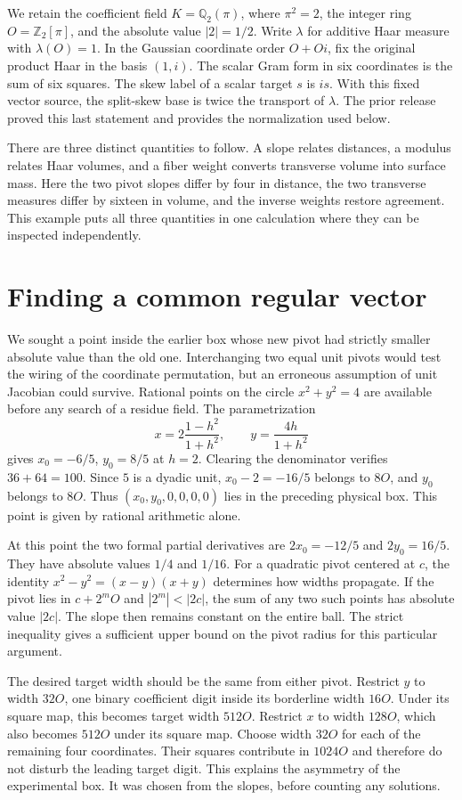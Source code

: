 \documentclass[12pt,letterpaper]{article}
\begin{document}
We retain the coefficient field $K=\mathbb Q_2(\pi)$, where $\pi^2=2$, the integer ring $O=\mathbb Z_2[\pi]$, and the absolute value $|2|=1/2$. Write $\lambda$ for additive Haar measure with $\lambda(O)=1$. In the Gaussian coordinate order $O+Oi$, fix the original product Haar in the basis $(1,i)$. The scalar Gram form in six coordinates is the sum of six squares. The skew label of a scalar target $s$ is $is$. With this fixed vector source, the split-skew base is twice the transport of $\lambda$. The prior release proved this last statement and provides the normalization used below.

There are three distinct quantities to follow. A slope relates distances, a modulus relates Haar volumes, and a fiber weight converts transverse volume into surface mass. Here the two pivot slopes differ by four in distance, the two transverse measures differ by sixteen in volume, and the inverse weights restore agreement. This example puts all three quantities in one calculation where they can be inspected independently.

\section{Finding a common regular vector}
We sought a point inside the earlier box whose new pivot had strictly smaller absolute value than the old one. Interchanging two equal unit pivots would test the wiring of the coordinate permutation, but an erroneous assumption of unit Jacobian could survive. Rational points on the circle $x^2+y^2=4$ are available before any search of a residue field. The parametrization
\[
  x=2\frac{1-h^2}{1+h^2},\qquad y=\frac{4h}{1+h^2}
\]
gives $x_0=-6/5$, $y_0=8/5$ at $h=2$. Clearing the denominator verifies $36+64=100$. Since $5$ is a dyadic unit, $x_0-2=-16/5$ belongs to $8O$, and $y_0$ belongs to $8O$. Thus $(x_0,y_0,0,0,0,0)$ lies in the preceding physical box. This point is given by rational arithmetic alone.

At this point the two formal partial derivatives are $2x_0=-12/5$ and $2y_0=16/5$. They have absolute values $1/4$ and $1/16$. For a quadratic pivot centered at $c$, the identity $x^2-y^2=(x-y)(x+y)$ determines how widths propagate. If the pivot lies in $c+2^mO$ and $|2^m|<|2c|$, the sum of any two such points has absolute value $|2c|$. The slope then remains constant on the entire ball. The strict inequality gives a sufficient upper bound on the pivot radius for this particular argument.

The desired target width should be the same from either pivot. Restrict $y$ to width $32O$, one binary coefficient digit inside its borderline width $16O$. Under its square map, this becomes target width $512O$. Restrict $x$ to width $128O$, which also becomes $512O$ under its square map. Choose width $32O$ for each of the remaining four coordinates. Their squares contribute in $1024O$ and therefore do not disturb the leading target digit. This explains the asymmetry of the experimental box. It was chosen from the slopes, before counting any solutions.
\end{document}
